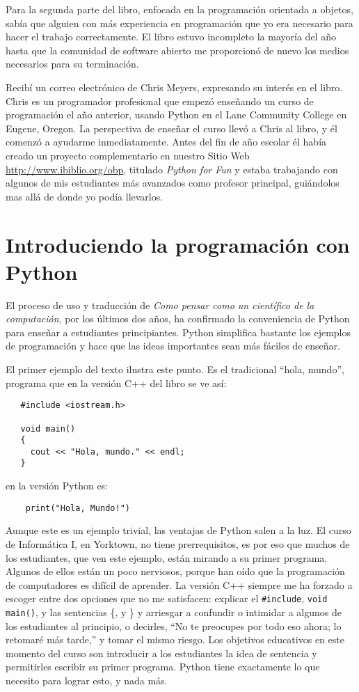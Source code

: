 Para la segunda parte del libro, enfocada en la programación orientada
a objetos, sabía que alguien con más experiencia en programación que
yo era necesario para hacer el trabajo correctamente. El libro estuvo
incompleto la mayoría del año hasta que la comunidad de software abierto
me proporcionó de nuevo los medios necesarios para su terminación.

Recibí un correo electrónico de Chris Meyers, expresando su interés
en el libro. Chris es un programador profesional que empezó enseñando
un curso de programación el año anterior, usando Python en el Lane
Community College en Eugene, Oregon. La perspectiva de enseñar el
curso llevó a Chris al libro, y él comenzó a ayudarme inmediatamente.
Antes del fin de año escolar él había creado un proyecto complementario
en nuestro Sitio Web \url{http://www.ibiblio.org/obp}, titulado {\em
Python for Fun} y estaba trabajando con algunos de mis estudiantes
más avanzados como profesor principal, guiándolos mas allá de donde
yo podía llevarlos.

\section*{Introduciendo la programación con Python}

El proceso de uso y traducción de {\em Como pensar como un científico
de la computación}, por los últimos dos años, ha confirmado la conveniencia
de Python para enseñar a estudiantes principiantes. Python simplifica
bastante los ejemplos de programación y hace que las ideas importantes
sean más fáciles de enseñar.

El primer ejemplo del texto ilustra este punto. Es el tradicional
``hola, mundo'', programa que en la versión C++ del libro se ve
así:
\begin{verbatim}
   #include <iostream.h>

   void main()
   {
     cout << "Hola, mundo." << endl;
   }
\end{verbatim}
en la versión Python es:
\begin{verbatim}
    print("Hola, Mundo!")
\end{verbatim}
Aunque este es un ejemplo trivial, las ventajas de Python salen a
la luz. El curso de Informática I, en Yorktown, no tiene prerrequisitos,
es por eso que muchos de los estudiantes, que ven este ejemplo, están
mirando a su primer programa. Algunos de ellos están un poco nerviosos,
porque han oído que la programación de computadores es difícil de
aprender. La versión C++ siempre me ha forzado a escoger entre dos
opciones que no me satisfacen: explicar el \texttt{\#include}, \texttt{void
main()}, y las sentencias \{, y \} y arriesgar a confundir o intimidar
a algunos de los estudiantes al principio, o decirles, ``No te preocupes
por todo eso ahora; lo retomaré más tarde,'' y tomar el mismo riesgo.
Los objetivos educativos en este momento del curso son introducir
a los estudiantes la idea de sentencia y permitirles escribir su primer
programa. Python tiene exactamente lo que necesito para lograr esto,
y nada más.

